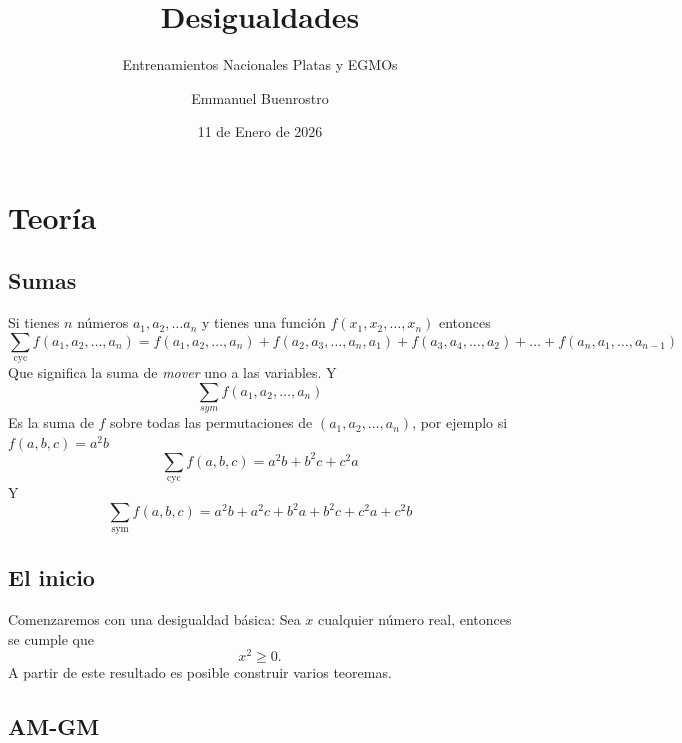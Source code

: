 \documentclass[11pt]{scrartcl}
\title {Desigualdades}
\subtitle{Entrenamientos Nacionales Platas y EGMOs}
\author{Emmanuel Buenrostro}
\date{11 de Enero de 2026}
\newcommand{\cyc}{\text{cyc}}
\newcommand{\sym}{\text{sym}}
\begin{document}
\maketitle
\section{Teor\'ia}
\subsection{Sumas}

Si tienes $n$ números $a_1, a_2, \ldots a_n$ y tienes una función $f(x_1, x_2, \ldots , x_n)$ entonces 
\[\sum_{\cyc} f(a_1,a_2,\ldots, a_n)=f(a_1,a_2,\ldots, a_n)+f(a_2,a_3,\ldots, a_n,a_1)+f(a_3,a_4,\ldots, a_2)+\ldots +f(a_n,a_1,\ldots, a_{n-1}) \]
Que significa la suma de \textit{mover} uno a las variables.  Y 
\[\sum_{sym} f(a_1, a_2, \ldots, a_n)\]   
Es la suma de $f$ sobre todas las permutaciones de $(a_1, a_2, \ldots, a_n)$, por ejemplo si $f(a,b,c)=a^2b$
\[\sum_{\cyc} f(a,b,c)= a^2b+b^2c+c^2a\]
Y 
\[\sum_{\sym} f(a,b,c)= a^2b+a^2c+b^2a+b^2c+c^2a+c^2b\]
\subsection{El inicio}
Comenzaremos con una desigualdad b\'asica: Sea $x$ cualquier n\'umero real, entonces se cumple que
$$x^2 \geq 0.$$
A partir de este resultado es posible construir varios teoremas. 

\subsection{AM-GM}
\end{document}
